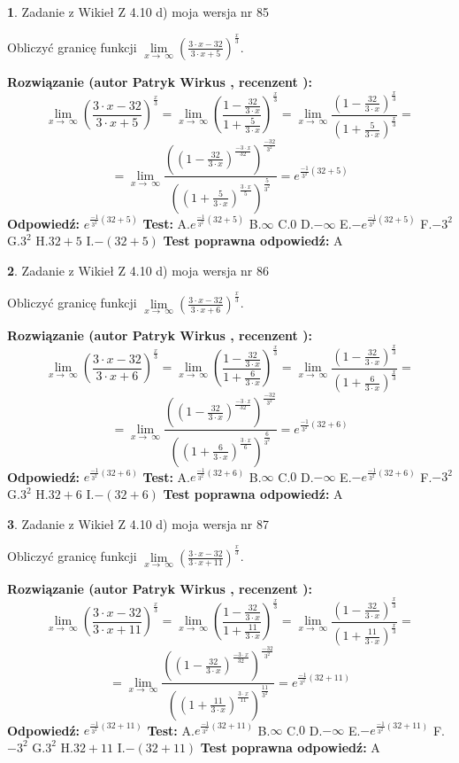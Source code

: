 \documentclass[12pt, a4paper]{article}
\theoremstyle{definition} %
\newtheorem{zad}{}
\newcommand{\zadStart}[1]{\begin{zad}#1\newline}
\newcommand{\zadStop}{\end{zad}}
\newcommand{\rozwStart}[2]{\noindent \textbf{Rozwiązanie (autor #1 , recenzent #2): }\newline}
\newcommand{\rozwStop}{\newline}
\newcommand{\odpStart}{\noindent \textbf{Odpowiedź:}\newline}
\newcommand{\odpStop}{\newline}
\newcommand{\testStart}{\noindent \textbf{Test:}\newline}
\newcommand{\testStop}{\newline}
\newcommand{\kluczStart}{\noindent \textbf{Test poprawna odpowiedź:}\newline}
\newcommand{\kluczStop}{\newline}
\begin{document}
\zadStart{Zadanie z Wikieł Z 4.10 d) moja wersja nr 85}


Obliczyć granicę funkcji  $\lim\limits_{x\to\ \infty}(\frac{3\cdot x-32}{3\cdot x+5})^{\frac{x}{3}}$.
\zadStop
\rozwStart{Patryk Wirkus}{}
$$\lim\limits_{x\to\ \infty}(\frac{3\cdot x-32}{3\cdot x+5})^{\frac{x}{3}} = \lim\limits_{x\to\ \infty}(\frac{1-\frac{32}{3\cdot x}}{1+\frac{5}{3\cdot x}})^{\frac{x}{3}}=\lim\limits_{x\to\ \infty}\frac{(1-\frac{32}{3\cdot x})^{\frac{x}{3}}}{(1+\frac{5}{3\cdot x})^{\frac{x}{3}}}=$$
$$=\lim\limits_{x\to\ \infty}\frac{((1-\frac{32}{3\cdot x})^{\frac{-3\cdot x}{32}})^{\frac{-32}{3^{2}}}}{((1+\frac{5}{3\cdot x})^{\frac{3\cdot x}{5}})^{\frac{5}{3^{2}}}}=e^{\frac{-1}{3^{2}}(32+5)}$$
\rozwStop
\odpStart
$e^{\frac{-1}{3^{2}}(32+5)}$
\odpStop
\testStart
A.$e^{\frac{-1}{3^{2}}(32+5)}$ B.$\infty$ C.$0$ D.$-\infty$ E.$-e^{\frac{-1}{3^{2}}(32+5)}$
F.$-3^{2}$ G.$3^{2}$
H.$32+5$
I.$-(32+5)$
\testStop
\kluczStart
A
\kluczStop



\zadStart{Zadanie z Wikieł Z 4.10 d) moja wersja nr 86}


Obliczyć granicę funkcji  $\lim\limits_{x\to\ \infty}(\frac{3\cdot x-32}{3\cdot x+6})^{\frac{x}{3}}$.
\zadStop
\rozwStart{Patryk Wirkus}{}
$$\lim\limits_{x\to\ \infty}(\frac{3\cdot x-32}{3\cdot x+6})^{\frac{x}{3}} = \lim\limits_{x\to\ \infty}(\frac{1-\frac{32}{3\cdot x}}{1+\frac{6}{3\cdot x}})^{\frac{x}{3}}=\lim\limits_{x\to\ \infty}\frac{(1-\frac{32}{3\cdot x})^{\frac{x}{3}}}{(1+\frac{6}{3\cdot x})^{\frac{x}{3}}}=$$
$$=\lim\limits_{x\to\ \infty}\frac{((1-\frac{32}{3\cdot x})^{\frac{-3\cdot x}{32}})^{\frac{-32}{3^{2}}}}{((1+\frac{6}{3\cdot x})^{\frac{3\cdot x}{6}})^{\frac{6}{3^{2}}}}=e^{\frac{-1}{3^{2}}(32+6)}$$
\rozwStop
\odpStart
$e^{\frac{-1}{3^{2}}(32+6)}$
\odpStop
\testStart
A.$e^{\frac{-1}{3^{2}}(32+6)}$ B.$\infty$ C.$0$ D.$-\infty$ E.$-e^{\frac{-1}{3^{2}}(32+6)}$
F.$-3^{2}$ G.$3^{2}$
H.$32+6$
I.$-(32+6)$
\testStop
\kluczStart
A
\kluczStop



\zadStart{Zadanie z Wikieł Z 4.10 d) moja wersja nr 87}


Obliczyć granicę funkcji  $\lim\limits_{x\to\ \infty}(\frac{3\cdot x-32}{3\cdot x+11})^{\frac{x}{3}}$.
\zadStop
\rozwStart{Patryk Wirkus}{}
$$\lim\limits_{x\to\ \infty}(\frac{3\cdot x-32}{3\cdot x+11})^{\frac{x}{3}} = \lim\limits_{x\to\ \infty}(\frac{1-\frac{32}{3\cdot x}}{1+\frac{11}{3\cdot x}})^{\frac{x}{3}}=\lim\limits_{x\to\ \infty}\frac{(1-\frac{32}{3\cdot x})^{\frac{x}{3}}}{(1+\frac{11}{3\cdot x})^{\frac{x}{3}}}=$$
$$=\lim\limits_{x\to\ \infty}\frac{((1-\frac{32}{3\cdot x})^{\frac{-3\cdot x}{32}})^{\frac{-32}{3^{2}}}}{((1+\frac{11}{3\cdot x})^{\frac{3\cdot x}{11}})^{\frac{11}{3^{2}}}}=e^{\frac{-1}{3^{2}}(32+11)}$$
\rozwStop
\odpStart
$e^{\frac{-1}{3^{2}}(32+11)}$
\odpStop
\testStart
A.$e^{\frac{-1}{3^{2}}(32+11)}$ B.$\infty$ C.$0$ D.$-\infty$ E.$-e^{\frac{-1}{3^{2}}(32+11)}$
F.$-3^{2}$ G.$3^{2}$
H.$32+11$
I.$-(32+11)$
\testStop
\kluczStart
A
\kluczStop
\end{document}
